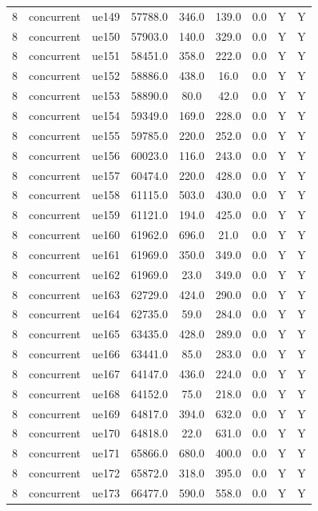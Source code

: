\begin{table}[ht]
\begin{tabular}{|c|c|c|c|c|c|c|c|c|}
8 & concurrent & ue149 & 57788.0 & 346.0 & 139.0 & 0.0 & Y & Y \\
8 & concurrent & ue150 & 57903.0 & 140.0 & 329.0 & 0.0 & Y & Y \\
8 & concurrent & ue151 & 58451.0 & 358.0 & 222.0 & 0.0 & Y & Y \\
8 & concurrent & ue152 & 58886.0 & 438.0 & 16.0 & 0.0 & Y & Y \\
8 & concurrent & ue153 & 58890.0 & 80.0 & 42.0 & 0.0 & Y & Y \\
8 & concurrent & ue154 & 59349.0 & 169.0 & 228.0 & 0.0 & Y & Y \\
8 & concurrent & ue155 & 59785.0 & 220.0 & 252.0 & 0.0 & Y & Y \\
8 & concurrent & ue156 & 60023.0 & 116.0 & 243.0 & 0.0 & Y & Y \\
8 & concurrent & ue157 & 60474.0 & 220.0 & 428.0 & 0.0 & Y & Y \\
8 & concurrent & ue158 & 61115.0 & 503.0 & 430.0 & 0.0 & Y & Y \\
8 & concurrent & ue159 & 61121.0 & 194.0 & 425.0 & 0.0 & Y & Y \\
8 & concurrent & ue160 & 61962.0 & 696.0 & 21.0 & 0.0 & Y & Y \\
8 & concurrent & ue161 & 61969.0 & 350.0 & 349.0 & 0.0 & Y & Y \\
8 & concurrent & ue162 & 61969.0 & 23.0 & 349.0 & 0.0 & Y & Y \\
8 & concurrent & ue163 & 62729.0 & 424.0 & 290.0 & 0.0 & Y & Y \\
8 & concurrent & ue164 & 62735.0 & 59.0 & 284.0 & 0.0 & Y & Y \\
8 & concurrent & ue165 & 63435.0 & 428.0 & 289.0 & 0.0 & Y & Y \\
8 & concurrent & ue166 & 63441.0 & 85.0 & 283.0 & 0.0 & Y & Y \\
8 & concurrent & ue167 & 64147.0 & 436.0 & 224.0 & 0.0 & Y & Y \\
8 & concurrent & ue168 & 64152.0 & 75.0 & 218.0 & 0.0 & Y & Y \\
8 & concurrent & ue169 & 64817.0 & 394.0 & 632.0 & 0.0 & Y & Y \\
8 & concurrent & ue170 & 64818.0 & 22.0 & 631.0 & 0.0 & Y & Y \\
8 & concurrent & ue171 & 65866.0 & 680.0 & 400.0 & 0.0 & Y & Y \\
8 & concurrent & ue172 & 65872.0 & 318.0 & 395.0 & 0.0 & Y & Y \\
8 & concurrent & ue173 & 66477.0 & 590.0 & 558.0 & 0.0 & Y & Y \\

\end{tabular}
\end{table}
